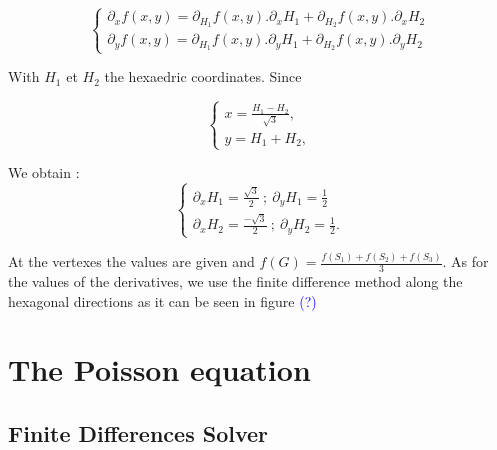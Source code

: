 \documentclass[proc]{edpsmath}
\begin{document}

\begin{equation}
\begin{cases}  

\partial _x f(x,y) = \partial _{H_1} f(x,y).   \partial _x H_1 +   \partial _{H_2} f(x,y).   \partial _x H_2  \\
\partial _y f(x,y) = \partial _{H_1} f(x,y).   \partial _y H_1 +   \partial _{H_2} f(x,y).   \partial _y H_2             

\end{cases}
\end{equation}

With $H_1$ et $H_2$ the  hexaedric coordinates. Since   

\begin{equation}
\begin{cases}  

\displaystyle{x = \frac{ H_1 - H_2 }{\sqrt{3}} },  \\[2mm]
\displaystyle{y =  H_1 + H_2 },        

\end{cases}
\end{equation}

We obtain :
\begin{equation}
	\begin{cases}  
       \displaystyle{  \partial _x H_1 = \frac{\sqrt{3}}{ 2} ~;~  \partial _y H_1 = \frac{1}{ 2}  }\\[2mm]
       \displaystyle{  \partial _x H_2 = \frac{-\sqrt{3}}{2} ~;~  \partial _y H_2 = \frac{1}{ 2}  } . 
\end{cases}	
\end{equation}

At the vertexes the values are given and $f(G) = \frac{f(S_1)+f(S_2)+f(S_3)}{3}$. As for the values of the derivatives, we use the finite difference method along the hexagonal directions as it can be seen in figure \textcolor{blue}{(?)}


\section{The Poisson equation}
\label{sec:poisson_eqn}
\subsection{Finite Differences Solver}
\end{document}
